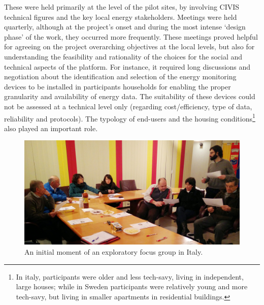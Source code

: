 These were held primarily at the level of the pilot sites, by involving CIVIS technical figures and the
key local energy stakeholders. Meetings were held quarterly, although at the project's onset and during
the most intense `design phase' of the work, they occurred more frequently.
% 
These meetings proved helpful for agreeing on the project overarching objectives at the local levels, but also
for understanding the feasibility and rationality of the choices for the social and technical aspects of the platform.
For instance, it required long discussions and negotiation about the identification and selection of the energy monitoring devices to be installed in
participants households for enabling the proper granularity and availability of energy data. 
The suitability of these devices could not be assessed at a technical level only (regarding cost/efficiency, type of data,
reliability and protocols).
The typology of end-users and the housing conditions\footnote{In italy, participants were older and less tech-savy, living in independent, large houses; while in Sweden participants were relatively young and more tech-savy, but living in smaller apartments in residential buildings.}
also played an important role. 

%
%


%
\begin{figure}[h!]
	\centering
	\includegraphics[width=.8\linewidth]{img/FocusGroup_TN.jpg}
	\caption{An initial moment of an exploratory focus group in Italy.}
	\label{fig:focusgroups}
\end{figure}


